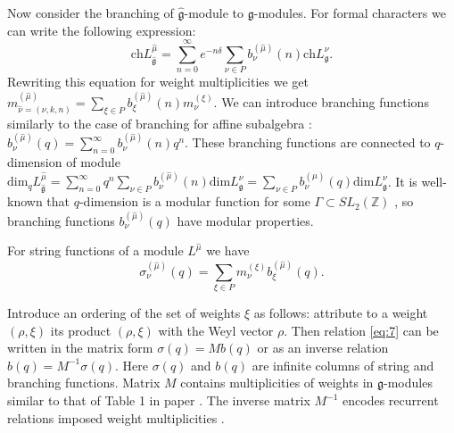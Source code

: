 \documentclass[12pt]{article}
\newcommand{\gf}{\mathfrak{g}}
\newcommand{\gfh}{\hat{\mathfrak{g}}}
\begin{document}
Now consider the branching of $\gfh$-module to $\gf$-modules. For
formal characters we can write the following expression:
\begin{equation}
  \label{eq:8}
\mathrm{ch}L^{\hat{\mu}}_{\gfh}=\sum_{n=0}^{\infty}e^{-n\delta} \sum_{\nu\in P} b^{(\hat{\mu})}_{\nu}(n) \mathrm{ch} L^{\nu}_{\gf}.
\end{equation}
Rewriting this equation for weight multiplicities we get
$m^{(\hat{\mu})}_{\hat{\nu}=(\nu,k,n)}=\sum_{\xi\in P}
b^{(\hat{\mu})}_{\xi}(n) m^{(\xi)}_{\nu}$. We can introduce
branching functions similarly to the case of branching for affine
subalgebra \cite{kac1988modular,kac1990idl}:
$b^{(\hat{\mu})}_{\nu}(q)=\sum_{n=0}^{\infty}
b^{(\hat{\mu})}_{\nu}(n) q^{n}$.  These branching functions are connected to $q$-dimension of module $\mathrm{dim}_{q}L^{\hat \mu}_{\gfh}=\sum_{n=0}^{\infty}q^{n}\sum_{\nu\in P} b^{(\hat \mu)}_{\nu}(n) \mathrm{dim }L^{\nu}_{\gf}=\sum_{\nu\in P}b^{(\hat\mu)}_{\nu}(q) \mathrm{dim} L^{\nu}_{\gf}$. It is well-known that $q$-dimension is a modular function for some $\Gamma\subset SL_{2}(\mathbb{Z})$  \cite{gannon2006moonshine}, so branching functions $b^{(\hat \mu)}_{\nu}(q)$ have modular properties.

 For string functions of a module
$L^{\hat{\mu}}$ we have
\begin{equation}
  \label{eq:7}
   \sigma^{(\hat{\mu})}_{\nu}(q) = \sum_{\xi\in P} m^{(\xi)}_{\nu} b^{(\hat{\mu})}_{\xi}(q).
\end{equation}

Introduce an ordering of the set of weights $\xi$ as follows:
attribute to a weight $(\rho,\xi)$ its product $(\rho,\xi)$ with
the Weyl vector $\rho$. Then relation \eqref{eq:7} can be written
in the matrix form $\sigma(q)=M b(q)$ or as an inverse relation
$b(q)=M^{-1}\sigma(q)$. Here $\sigma(q)$ and $b(q)$ are infinite
columns of string and branching functions. Matrix $M$ contains
multiplicities of weights in $\gf$-modules similar to that of
Table 1 in paper \cite{2010arXiv1001}. The inverse matrix $M^{-1}$
encodes recurrent relations imposed weight multiplicities
\cite{il2010folded}.
\end{document}
